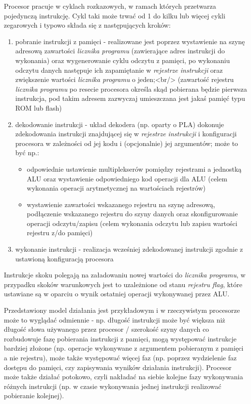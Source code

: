 \documentclass{pdfBooklets}
\begin{document}
Procesor pracuje w cyklach rozkazowych, w ramach których przetwarza pojedynczą instrukcję. Cykl taki może trwać od 1 do kilku lub więcej cykli zegarowych i typowo składa się z następujących kroków:
\begin{enumerate}
	\item pobranie instrukcji z pamięci - realizowane jest poprzez wystawienie na szynę adresową zawartości \emph{licznika programu} (zawierające adres instrukcji do wykonania) oraz wygenerowanie cyklu odczytu z pamięci, po wykonaniu odczytu danych następuje ich zapamiętanie w \emph{rejestrze instrukcji} oraz zwiększenie wartości \emph{licznika programu} o jeden;<br/>
		(zawartość rejestru \emph{licznika programu} po resecie procesora określa skąd pobierana będzie pierwsza instrukcja, pod takim adresem zazwyczaj umieszczana jest jakaś pamięć typu ROM lub flash)
	\item dekodowanie instrukcji - układ dekodera (np. oparty o PLA) dokonuje zdekodowania instrukcji znajdującej się w \emph{rejestrze instrukcji} i konfiguracji procesora w zależności od jej kodu i (opcjonalnie) jej argumentów; może to być np.:
	\begin{itemize}
		\item odpowiednie ustawienie multiplekserów pomiędzy rejestrami a jednostką ALU oraz wystawienie odpowiedniego kod operacji dla ALU (celem wykonania operacji arytmetycznej na wartościach rejestrów)
		\item wystawienie zawartości wskazanego rejestru na szynę adresową, podłączenie wskazanego rejestru do szyny danych oraz skonfigurowanie operacji odczytu/zapisu (celem wykonania odczytu lub zapisu wartości rejestru z/do pamięci)
	\end{itemize}
	\item wykonanie instrukcji - realizacja wcześniej zdekodowanej instrukcji zgodnie z ustawioną konfiguracją procesora
\end{enumerate}

Instrukcje skoku polegają na załadowaniu nowej wartości do \emph{licznika programu}, w przypadku skoków warunkowych jest to uzależnione od stanu \emph{rejestru flag}, które ustawiane są w oparciu o wynik ostatniej operacji wykonywanej przez ALU.

Przedstawiony model działania jest przykładowym i w rzeczywistym procesorze może to wyglądać odmiennie - np. długość instrukcji może być większa niż długość słowa używanego przez procesor / szerokość szyny danych co rozbudowuje fazę pobierania instrukcji z pamięci, mogą występować instrukcje bardziej złożone (np. operacje wykonywane z argumentem pobieranym z pamięci a nie rejestru), może także występować więcej faz (np. poprzez wydzielenie faz dostępu do pamięci, czy zapisywania wyników działania instrukcji).
Procesor może także działać potokowo, czyli nakładać na siebie kolejne fazy wykonywania różnych instrukcji (np. w czasie wykonywania jednej instrukcji realizować pobieranie kolejnej).
\end{document}
